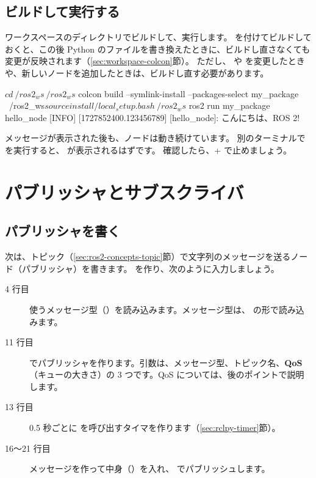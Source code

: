 \subsection{ビルドして実行する}

ワークスペースのディレクトリでビルドして、実行します。
 を付けてビルドしておくと、この後 Python のファイルを書き換えたときに、ビルドし直さなくても変更が反映されます（\ref{sec:workspace-colcon}節）。
ただし、 や  を変更したときや、新しいノードを追加したときは、ビルドし直す必要があります。

\begin{terminal}[はじめてのノードをビルドして実行する]
$ cd ~/ros2_ws
~/ros2_ws$ colcon build --symlink-install --packages-select my_package
~/ros2_ws$ source install/local_setup.bash
~/ros2_ws$ ros2 run my_package hello_node
[INFO] [1727852400.123456789] [hello_node]: こんにちは、ROS 2!
\end{terminal}

メッセージが表示された後も、ノードは動き続けています。
別のターミナルで  を実行すると、 が表示されるはずです。
確認したら、+ で止めましょう。

\section{パブリッシャとサブスクライバ}
\label{sec:rclpy-pubsub}

\subsection{パブリッシャを書く}

次は、トピック（\ref{sec:ros2-concepts-topic}節）で文字列のメッセージを送るノード（パブリッシャ）を書きます。
 を作り、次のように入力しましょう。


\begin{description}
  \item[4 行目] 使うメッセージ型（）を読み込みます。メッセージ型は、 の形で読み込みます。
  \item[11 行目]  でパブリッシャを作ります。引数は、メッセージ型、トピック名、\textbf{QoS}（キューの大きさ）の 3 つです。QoS については、後のポイントで説明します。
  \item[13 行目] 0.5 秒ごとに  を呼び出すタイマを作ります（\ref{sec:rclpy-timer}節）。
  \item[16〜21 行目] メッセージを作って中身（）を入れ、 でパブリッシュします。
\end{description}

